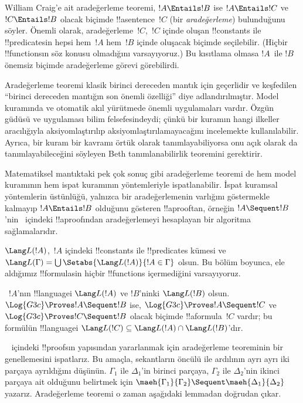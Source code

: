 \documentclass[../../../include/open-logic-section]{subfiles}
\begin{document}


William Craig'e ait aradeğerleme teoremi, $!A \Entails !B$ ise $!A
\Entails !C$ ve $!C \Entails !B$ olacak biçimde !!a{sentence}~$!C$ (bir
\emph{aradeğerleme}) bulunduğunu söyler. Önemli olarak,
aradeğerleme~$!C$,~$!C$ içinde oluşan !!{constant}s ile !!{predicate}s{}in
hepsi hem~$!A$ hem~$!B$ içinde oluşacak biçimde seçilebilir. (Hiçbir
!!{function}s{}ın söz konusu olmadığını varsayıyoruz.) Bu kısıtlama olmasa
$!A$~ile $!B$ önemsiz biçimde aradeğerleme görevi görebilirdi.

Aradeğerleme teoremi klasik birinci dereceden mantık için geçerlidir ve
keşfedilen ``birinci dereceden mantığın son önemli özelliği'' diye
adlandırılmıştır. Model kuramında ve otomatik akıl yürütmede önemli
uygulamaları vardır. Özgün güdüsü ve uygulaması bilim felsefesindeydi;
çünkü bir kuramın hangi ilkeller aracılığıyla aksiyomlaştırılıp
aksiyomlaştırılamayacağını incelemekte kullanılabilir. Ayrıca, bir kuram bir
kavramı örtük olarak tanımlayabiliyorsa onu açık olarak da
tanımlayabileceğini söyleyen Beth tanımlanabilirlik teoremini gerektirir.

Matematiksel mantıktaki pek çok sonuç gibi aradeğerleme teoremi de hem model
kuramının hem ispat kuramının yöntemleriyle ispatlanabilir. İspat kuramsal
yöntemlerin üstünlüğü, yalnızca bir aradeğerlemenin varlığını göstermekle
kalmayıp $!A \Entails !B$ olduğunu gösteren !!a{proof}{}tan, örneğin $!A
\Sequent !B$'nin~ içindeki !!a{proof}{}ından aradeğerlemeyi hesaplayan
bir algoritma sağlamalarıdır.

$\Lang L(!A)$,~$!A$ içindeki !!{constant}s ile !!{predicate}s kümesi ve
$\Lang L(\Gamma) = \bigcup \Setabs{\Lang L(!A)}{!A \in \Gamma}$ olsun. Bu
bölüm boyunca, ele aldığımız !!{formula}s{}in hiçbir !!{function}s
içermediğini varsayıyoruz.

\begin{thm}
~$!A$'nın !!{language}{}i $\Lang L(!A)$ ve $!B$'ninki $\Lang L(!B)$ olsun.
$\Log{G3c} \Proves !A \Sequent !B$ ise, $\Log{G3c} \Proves !A \Sequent !C$
ve $\Log{G3c} \Proves !C \Sequent !B$ olacak biçimde !!a{formula}~$!C$
vardır; bu formülün !!{language}{}i $\Lang L(!C) \subseteq \Lang L(!A) \cap
\Lang L(!B)$'dır.
\end{thm}

~ içindeki !!{proof}s{}ın yapısından yararlanmak için aradeğerleme
teoreminin bir genellemesini ispatlarız. Bu amaçla, sekantların öncülü ile
ardılının ayrı ayrı iki parçaya ayrıldığını düşünün. $\Gamma_1$ ile
$\Delta_1$'in birinci parçaya, $\Gamma_2$ ile $\Delta_2$'nin ikinci parçaya
ait olduğunu belirtmek için $\maeh{\Gamma_1}{\Gamma_2} \Sequent
\maeh{\Delta_1}{\Delta_2}$ yazarız. Aradeğerleme teoremi o zaman aşağıdaki
lemmadan doğrudan çıkar.
\end{document}

